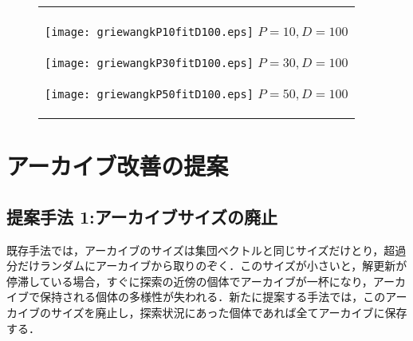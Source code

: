 \documentclass[a4paper,11pt,oneside,openany]{jsbook}
\begin{document}
\begin{figure}[htbp]
  \begin{center}
    \begin{tabular}{c}

      \begin{minipage}{0.33\hsize}
        \begin{center}
          \texttt{[image: griewangkP10fitD100.eps]}
          \hspace{1.2cm} $P=10, D=100$
        \end{center}
      \end{minipage}

      \begin{minipage}{0.33\hsize}
        \begin{center}
          \texttt{[image: griewangkP30fitD100.eps]}
          \hspace{1.2cm} $P=30, D=100$
        \end{center}
      \end{minipage}

      \begin{minipage}{0.33\hsize}
        \begin{center}
          \texttt{[image: griewangkP50fitD100.eps]}
          \hspace{1.2cm} $P=50, D=100$
        \end{center}
      \end{minipage}
    \end{tabular}
    \label{fig:lena}
  \end{center}
\end{figure}
\newpage


\chapter{アーカイブ改善の提案}
\section{提案手法 1:アーカイブサイズの廃止}
既存手法では，アーカイブのサイズは集団ベクトルと同じサイズだけとり，超過分だけランダムにアーカイブから取りのぞく．このサイズが小さいと，解更新が停滞している場合，すぐに探索の近傍の個体でアーカイブが一杯になり，アーカイブで保持される個体の多様性が失われる．新たに提案する手法では，このアーカイブのサイズを廃止し，探索状況にあった個体であれば全てアーカイブに保存する．
\end{document}
